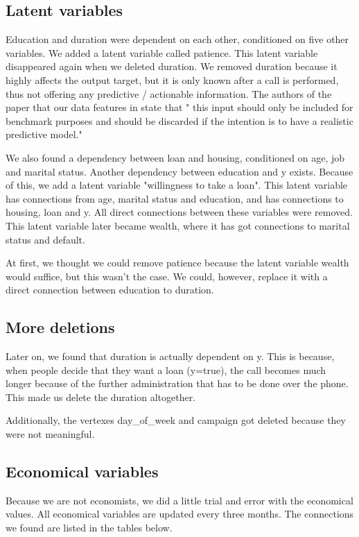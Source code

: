 \documentclass[11pt]{article}
\begin{document}
\begin{multicols}{2}
\subsection{Latent variables}
Education and duration were dependent on each other, conditioned on five other
variables. We added a latent variable called patience. This latent variable
disappeared again when we deleted duration. We removed duration because it highly affects the output target, but it is only known after a call is performed, thus not offering any predictive / actionable information.
The authors of the paper that our data features in state that " this input should only be included for benchmark purposes and should be discarded if the intention is to have a realistic predictive model."

We also found a dependency between loan and housing, conditioned on age, job and
marital status. Another dependency between education and y exists. Because of
this, we add a latent variable "willingness to take a loan". This latent
variable has connections from age, marital status and education, and has
connections to housing, loan and y. All direct connections between these
variables were removed. This latent variable later became wealth, where it has
got connections to marital status and default. 

At first, we thought we could remove patience because the latent variable wealth
would suffice, but this wasn't the case. We could, however, replace it with a
direct connection between education to duration. 

\subsection{More deletions}
Later on, we found that duration is actually dependent on y. This is because,
when people decide that they want a loan (y=true), the call becomes much longer
because of the further administration that has to be done over the phone. This
made us delete the duration altogether. 

Additionally, the vertexes day\_of\_week and campaign got deleted because they
were not meaningful. 

\subsection{Economical variables}
Because we are not economists, we did a little trial and error with the
economical values. All economical variables are updated every three months. The
connections we found are listed in the tables below. 


\end{multicols}
\end{document}
